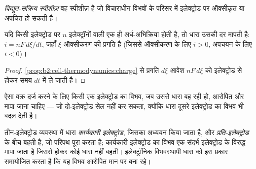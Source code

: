 \begin{definition}[विद्युत-सक्रिय स्पीशीज़]\label{def:b2:current-potential-curves:electroactive}
\emph{विद्युत-सक्रिय स्पीशीज़} वह स्पीशीज़ है
जो विचाराधीन विभवों के परिसर में इलेक्ट्रोड पर ऑक्सीकृत या अपचित
हो सकती है।
\end{definition}

\begin{proposition}[धारा और दर]\label{prop:b2:current-potential-curves:current-rate}
यदि किसी इलेक्ट्रोड पर $n$ इलेक्ट्रॉनों वाली एक ही अर्ध-अभिक्रिया होती है, तो
धारा उसकी दर मापती है: $i = nF\,d\xi/dt$, जहाँ $\xi$ ऑक्सीकरण की प्रगति है
(जिससे ऑक्सीकरण के लिए $i > 0$, अपचयन के लिए $i < 0$)।
\end{proposition}

\begin{proof}
\cref{prop:b2:cell-thermodynamics:charge} से प्रगति $d\xi$ आवेश $nF\,d\xi$ को
इलेक्ट्रोड से होकर समय $dt$ में ले जाती है।
\end{proof}

ऐसा वक्र दर्ज करने के लिए किसी एक इलेक्ट्रोड का विभव, जब उससे धारा बह रही हो,
आरोपित और मापा जाना चाहिए --- जो दो-इलेक्ट्रोड सेल नहीं कर सकता,
क्योंकि धारा दूसरे इलेक्ट्रोड का विभव भी बदल देती है।

\begin{definition}[तीन-इलेक्ट्रोड व्यवस्था]\label{def:b2:current-potential-curves:set-up}
तीन-इलेक्ट्रोड व्यवस्था में धारा \emph{कार्यकारी
इलेक्ट्रोड}, जिसका अध्ययन किया जाता है, और \emph{प्रति-इलेक्ट्रोड}
के बीच बहती है, जो परिपथ पूरा करता है; कार्यकारी इलेक्ट्रोड का विभव एक संदर्भ इलेक्ट्रोड
के विरुद्ध मापा जाता है जिससे होकर कोई धारा नहीं बहती।
इलेक्ट्रॉनिक विभवस्थापी धारा को इस प्रकार समायोजित करता है कि
यह विभव आरोपित मान पर बना रहे।
\end{definition}

